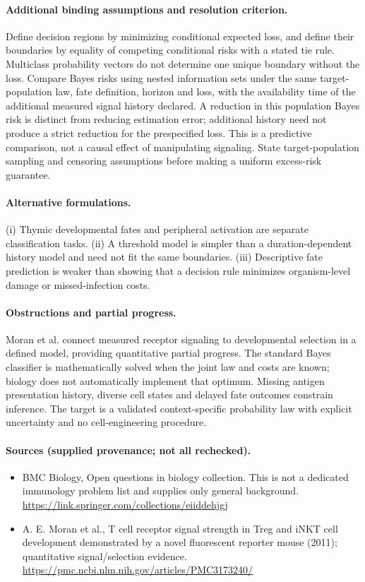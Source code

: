 \documentclass[11pt]{article}
\begin{document}
\paragraph{Additional binding assumptions and resolution criterion.} Define decision regions by minimizing conditional expected loss, and define their boundaries by equality of competing conditional risks with a stated tie rule. Multiclass probability vectors do not determine one unique boundary without the loss. Compare Bayes risks using nested information sets under the same target-population law, fate definition, horizon and loss, with the availability time of the additional measured signal history declared. A reduction in this population Bayes risk is distinct from reducing estimation error; additional history need not produce a strict reduction for the prespecified loss. This is a predictive comparison, not a causal effect of manipulating signaling. State target-population sampling and censoring assumptions before making a uniform excess-risk guarantee.

\paragraph{Alternative formulations.} (i) Thymic developmental fates and peripheral activation are separate classification tasks. (ii) A threshold model is simpler than a duration-dependent history model and need not fit the same boundaries. (iii) Descriptive fate prediction is weaker than showing that a decision rule minimizes organism-level damage or missed-infection costs.
\paragraph{Obstructions and partial progress.} Moran et al. connect measured receptor signaling to developmental selection in a defined model, providing quantitative partial progress. The standard Bayes classifier is mathematically solved when the joint law and costs are known; biology does not automatically implement that optimum. Missing antigen presentation history, diverse cell states and delayed fate outcomes constrain inference. The target is a validated context-specific probability law with explicit uncertainty and no cell-engineering procedure.
\paragraph{Sources (supplied provenance; not all rechecked).}
\begin{itemize}
\item BMC Biology, Open questions in biology collection. This is not a dedicated immunology problem list and supplies only general background. \url{https://link.springer.com/collections/eiiddehjgj}
\item A. E. Moran et al., T cell receptor signal strength in Treg and iNKT cell development demonstrated by a novel fluorescent reporter mouse (2011); quantitative signal/selection evidence. \url{https://pmc.ncbi.nlm.nih.gov/articles/PMC3173240/}
\end{itemize}
\end{document}
